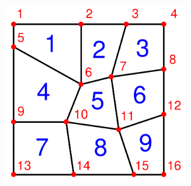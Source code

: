 \begin{figure}[ht]
    \centering
    \includegraphics[height=80mm]{Slike/deformedRegion.png}
\end{figure}

